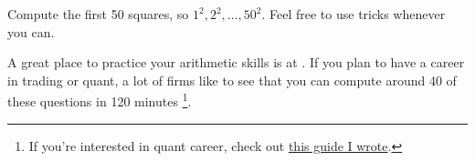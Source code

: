 \begin{exercise}
  Compute the first 50 squares, so $1^2, 2^2, \dots, 50^2$. Feel free to use tricks whenever you can.
\end{exercise}

\begin{exercise}
  A great place to practice your arithmetic skills is at \href{https://arithmetic.zetamac.com/}{}.
  If you plan to have a career in trading or quant, a lot of firms like to see that you can compute around 40 of these questions in 120 minutes \footnote{If you're interested in quant career, check out \href{https://github.com/mikinty/Trading-Interview-Questions}{this guide I wrote}.}.
\end{exercise}
